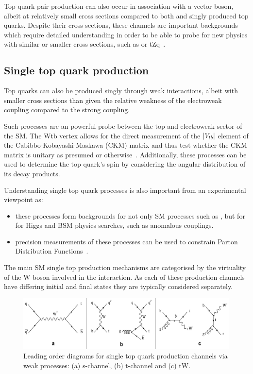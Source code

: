 Top quark pair production can also occur in association with a vector boson, albeit at relatively small cross sections compared to both \ttbar and singly produced top quarks.
Despite their cross sections, these channels are important backgrounds which require detailed understanding in order to be able to probe for new physics with similar or smaller cross sections, such as \ttH or tZq~\cite{Khachatryan:2014ewa}.

\subsection{Single top quark production}\label{subsec:singleTopTheory}
Top quarks can also be produced singly through weak interactions, albeit with smaller cross sections than \ttbar given the relative weakness of the electroweak coupling compared to the strong coupling.

Such processes are an powerful probe between the top and electroweak sector of the SM.
The Wtb vertex allows for the direct measurement of the $\lvert V_{tb} \rvert$ element of the Cabibbo-Kobayashi-Maskawa (CKM) matrix and thus test whether the CKM matrix is unitary as presumed or otherwise~\cite{Shibata:2008sy}.
Additionally, these processes can be used to determine the top quark's spin by considering the angular distribution of its decay products.

Understanding single top quark processes is also important from an experimental viewpoint as:
\begin{itemize}
\item these processes form backgrounds for not only SM processes such as \ttbar, but for for Higgs and BSM physics searches, such as anomalous couplings.
\item precision measurements of these processes can be used to constrain Parton Distribution Functions~\cite{Guffanti:2010yu}.
\end{itemize}

The main SM single top production mechanisms are categorised by the virtuality of the W boson involved in the interaction.
As each of these production channels have differing initial and final states they are typically considered separately.

\begin{figure}[!h]
\centering
\includegraphics[width=1.00\textwidth]{figs/top-physics/singletop_feyn.jpg}
\caption{Leading order diagrams for single top quark production channels via weak processes: (a) s-channel, (b) t-channel and (c) tW.}
\label{fig:singleTopDiagrams}
\end{figure}

